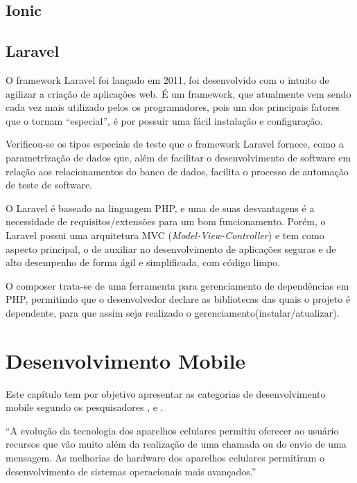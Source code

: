 \subsection{Ionic}



\subsection{Laravel}

O framework Laravel foi lançado em 2011, foi desenvolvido com o intuito de agilizar a criação de aplicações web. É um framework, que atualmente vem sendo cada vez mais utilizado pelos os programadores, pois um dos principais fatores que o tornam “especial”, é por possuir uma fácil instalação e configuração. 

\begin{citacao}
	Verificou-se os tipos especiais de teste que o framework Laravel fornece, como a parametrização de dados que, além de facilitar o desenvolvimento de software em relação aos relacionamentos do banco de dados, facilita o processo de automação de teste de software.\cite{pelizza2018estudo}
\end{citacao}


O Laravel é baseado na linguagem PHP, e uma de suas desvantagens é a necessidade de requisitos/extensões para um bom funcionamento. Porém, o Laravel possui uma arquitetura MVC (\textit{Model-View-Controller}) e tem como aspecto principal, o de auxiliar no desenvolvimento de aplicações seguras e de alto desempenho de forma ágil e simplificada, com código limpo.\cite{pelizza2018estudo}


O composer trata-se de uma ferramenta para gerenciamento de dependências em PHP, permitindo que o desenvolvedor declare as bibliotecas das quais o projeto é dependente, para que assim seja realizado o gerenciamento(instalar/atualizar). \cite{composer}

\section{Desenvolvimento Mobile}

Este capítulo tem por objetivo apresentar as categorias de desenvolvimento mobile segundo os pesquisadores ,  e .

\begin{citacao}
	“A evolução da tecnologia dos aparelhos celulares permitiu oferecer ao usuário recursos que vão muito além da realização de uma chamada ou do envio de uma mensagem. As melhorias de hardware dos aparelhos celulares permitiram o desenvolvimento de sistemas operacionais mais avançados.”\cite[]{da2014paradigmas}
\end{citacao}

